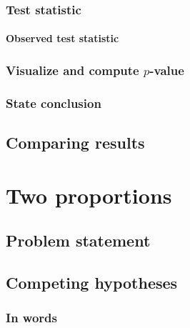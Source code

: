 \documentclass[
  12pt, krantz2,
]{krantz}
\begin{document}
\hypertarget{test-statistic-1}{%
\subsubsection*{Test statistic}\label{test-statistic-1}}


\hypertarget{observed-test-statistic-1}{%
\paragraph{Observed test statistic}\label{observed-test-statistic-1}}

\hypertarget{visualize-and-compute-p-value}{%
\subsubsection*{\texorpdfstring{Visualize and compute \(p\)-value}{Visualize and compute p-value}}\label{visualize-and-compute-p-value}}


\hypertarget{state-conclusion-1}{%
\subsubsection*{State conclusion}\label{state-conclusion-1}}


\hypertarget{comparing-results-1}{%
\subsection{Comparing results}\label{comparing-results-1}}

\hypertarget{two-proportions}{%
\section{Two proportions}\label{two-proportions}}

\hypertarget{problem-statement-2}{%
\subsection{Problem statement}\label{problem-statement-2}}

\hypertarget{competing-hypotheses-2}{%
\subsection{Competing hypotheses}\label{competing-hypotheses-2}}

\hypertarget{in-words-2}{%
\subsubsection*{In words}\label{in-words-2}}
\end{document}

